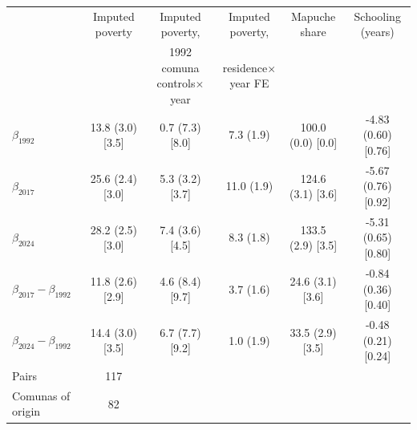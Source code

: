\begin{tabular}{lccccc}
\toprule
 & Imputed poverty & Imputed poverty, & Imputed poverty, & Mapuche share & Schooling (years) \\
 & & 1992 comuna controls$\times$year & residence$\times$year FE & & \\
\midrule
$\beta_{1992}$ & 13.8 (3.0) [3.5] & 0.7 (7.3) [8.0] & 7.3 (1.9) & 100.0 (0.0) [0.0] & -4.83 (0.60) [0.76] \\
$\beta_{2017}$ & 25.6 (2.4) [3.0] & 5.3 (3.2) [3.7] & 11.0 (1.9) & 124.6 (3.1) [3.6] & -5.67 (0.76) [0.92] \\
$\beta_{2024}$ & 28.2 (2.5) [3.0] & 7.4 (3.6) [4.5] & 8.3 (1.8) & 133.5 (2.9) [3.5] & -5.31 (0.65) [0.80] \\
\midrule
$\beta_{2017}-\beta_{1992}$ & 11.8 (2.6) [2.9] & 4.6 (8.4) [9.7] & 3.7 (1.6) & 24.6 (3.1) [3.6] & -0.84 (0.36) [0.40] \\
$\beta_{2024}-\beta_{1992}$ & 14.4 (3.0) [3.5] & 6.7 (7.7) [9.2] & 1.0 (1.9) & 33.5 (2.9) [3.5] & -0.48 (0.21) [0.24] \\
\midrule
Pairs & 117 & & & & \\
Comunas of origin & 82 & & & & \\
\bottomrule
\end{tabular}
